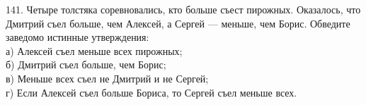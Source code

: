 141. Четыре толстяка соревновались, кто больше съест пирожных. Оказалось, что Дмитрий съел больше, чем Алексей, а Сергей --- меньше, чем Борис. Обведите заведомо истинные утверждения:\\
а) Алексей съел меньше всех пирожных;\\
б) Дмитрий съел больше, чем Борис;\\
в) Меньше всех съел не Дмитрий и не Сергей;\\
г) Если Алексей съел больше Бориса, то Сергей съел меньше всех.\\
